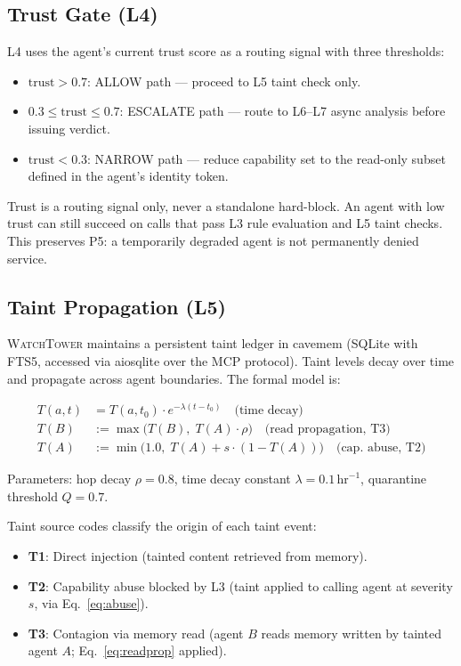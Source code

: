 \documentclass[conference]{IEEEtran}
\begin{document}
\subsection{Trust Gate (L4)}

L4 uses the agent's current trust score as a routing signal with three
thresholds:

\begin{itemize}
\item $\text{trust} > 0.7$: ALLOW path --- proceed to L5 taint check only.
\item $0.3 \leq \text{trust} \leq 0.7$: ESCALATE path --- route to
      L6--L7 async analysis before issuing verdict.
\item $\text{trust} < 0.3$: NARROW path --- reduce capability set to the
      read-only subset defined in the agent's identity token.
\end{itemize}

Trust is a routing signal only, never a standalone hard-block. An agent
with low trust can still succeed on calls that pass L3 rule evaluation
and L5 taint checks. This preserves P5: a temporarily degraded agent is
not permanently denied service.

\subsection{Taint Propagation (L5)}

\textsc{WatchTower} maintains a persistent taint ledger in cavemem
(SQLite with FTS5, accessed via aiosqlite over the MCP protocol). Taint
levels decay over time and propagate across agent boundaries. The formal
model is:

\begin{align}
  T(a, t) &= T(a, t_0) \cdot e^{-\lambda(t - t_0)}
    \quad \text{(time decay)} \label{eq:decay} \\
  T(B) &:= \max\!\bigl(T(B),\; T(A) \cdot \rho\bigr)
    \quad \text{(read propagation, T3)} \label{eq:readprop} \\
  T(A) &:= \min\!\bigl(1.0,\; T(A) + s \cdot (1 - T(A))\bigr)
    \quad \text{(cap.\ abuse, T2)} \label{eq:abuse}
\end{align}

Parameters: hop decay $\rho = 0.8$, time decay constant
$\lambda = 0.1\,\text{hr}^{-1}$, quarantine threshold $Q = 0.7$.

Taint source codes classify the origin of each taint event:
\begin{itemize}
\item \textbf{T1}: Direct injection (tainted content retrieved from memory).
\item \textbf{T2}: Capability abuse blocked by L3 (taint applied to
      calling agent at severity $s$, via Eq.~\ref{eq:abuse}).
\item \textbf{T3}: Contagion via memory read (agent $B$ reads memory
      written by tainted agent $A$; Eq.~\ref{eq:readprop} applied).
\end{itemize}
\end{document}
